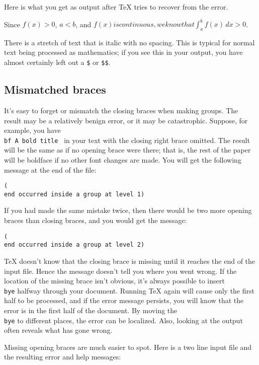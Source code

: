 Here is what you get as output after \TeX{} tries to recover from 
the error. 
 
Since $f(x) > 0$, $a<b$,  and $f(x) is continuous, we know that 
\int_a^b f(x)\,dx >0$. 
 
There is a stretch of text that is italic with no spacing.  This 
is typical for normal text being processed as mathematics; if you 
see this in your output, you have almost certainly left out a 
{\tt \$} or {\tt \$\$}. 
 
\subsection{Mismatched braces} 
 
It's easy to forget or mismatch the closing braces when making 
groups.  The result may be a relatively benign error, or it may 
be catastrophic. Suppose, for example, you have {\tt \lb\\bf A 
bold title } in your text with the closing right brace omitted. 
The result will be the same as if no opening brace were there; 
that is, the rest of the paper will be boldface if no other font 
changes are made.  You will get the following message at the end 
of the file: 
 
{\tt (\\end occurred inside a group at level 1)} 
 
If you had made the same mistake twice, then there would be two 
more opening braces than closing braces, and you would get the 
message: 
 
{\tt (\\end occurred inside a group at level 2)} 
 
\TeX{} doesn't know that the closing brace is missing until it 
reaches the end of the input file.  Hence the message doesn't 
tell you where you went wrong.  If the location of the missing 
brace isn't obvious, it's always possible to insert {\tt \\bye} 
halfway through your document.  Running \TeX{} again will cause 
only the first half to be processed, and if the error message 
persists, you will know that the error is in the first half of 
the document.  By moving the {\tt \\bye} to different places, the 
error can be localized.  Also, looking at the output often 
reveals what has gone wrong. 
 
Missing opening braces are much easier to spot.  Here is a two 
line input file and the resulting error and help messages: 
 
